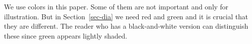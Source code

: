 \begin{rem}\label{remark-colors}
We use colors in this paper. Some of them are not important and only 
for illustration. But in Section~\ref{sec-dia} we 
need red and green and it is crucial 
that they are different.
The reader 
who has a black-and-white version can distinguish these 
since green appears lightly shaded.
\end{rem}